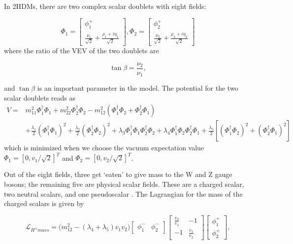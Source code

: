In 2HDMs, there are two complex scalar doublets with eight fields:

\begin{equation}
	\Phi_1 = \begin{bmatrix} \phi_1^+ \\ \frac{\nu_1}{\sqrt{2}} + \frac{\rho_1+i\eta_1}{\sqrt{2}}  \end{bmatrix} , 
    \Phi_2 = \begin{bmatrix} \phi_2^+ \\ \frac{\nu_2}{\sqrt{2}} + \frac{\rho_2+i\eta_2}{\sqrt{2}}  \end{bmatrix}
\end{equation}
\noindent where the ratio of the VEV of the two doublets are

\begin{equation}
\tan \beta = \frac{\nu_2}{\nu_1},
\end{equation}

\noindent and $\tan \beta$  is an important parameter in the model. The potential for the two scalar doublets reads as
\begin{equation}
\begin{split}
V=& m_{11}^2 \Phi_1^\dagger \Phi_1 + m_{22}^2 \Phi_2^\dagger \Phi_2 - m_{12}^2 ( \Phi_1^\dagger \Phi_2+\Phi_2^\dagger \Phi_1) \\
&  +\frac{\lambda_1}{2}(\Phi_1^\dagger \Phi_1)^2 +\frac{\lambda_2}{2}(\Phi_2^\dagger \Phi_2)^2
+\lambda_3 \Phi_1^\dagger \Phi_1 \Phi_2^\dagger \Phi_2 +\lambda_4 \Phi_1^\dagger \Phi_2 \Phi_2^\dagger \Phi_1
+\frac{\lambda_5}{2}[ (\Phi_1^\dagger \Phi_2)^2 + (\Phi_2^\dagger \Phi_1)^2 ]
\end{split}
\end{equation}
\noindent which is minimized when we choose the vacuum expectation value $\Phi_1= [0,v_1/\sqrt{2}]^T$ and $\Phi_2= [0,v_2/\sqrt{2}]^T$.



\noindent Out of the eight fields, three get ‘eaten’ to give mass to the W and Z gauge bosons; the remaining five are physical scalar fields. These are a charged scalar, two neutral scalars, and one pseudoscalar \cite{BRANCO20121}. The Lagrangian for the mass of the charged scalars is given by


\begin{equation}
	\mathcal{L}_{H^{\pm} mass} = \big( m_{12}^2 -(\lambda_4+\lambda_5) v_1 v_2 \big) 
    \begin{bmatrix} \phi_1^- & \phi_2^-  \end{bmatrix}
    \begin{bmatrix} \frac{v_2}{v_1} & -1 \\ -1 & \frac{v_1}{v_2} \end{bmatrix}
    \begin{bmatrix} \phi_1^+ \\ \phi_2^+ \end{bmatrix} ,
\end{equation}

